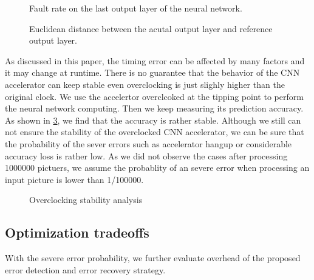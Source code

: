 \begin{figure}
    \caption{Fault rate on the last output layer of the neural network.}
\label{fig:cuowulv}
\vspace{-1em}
\end{figure}

\begin{figure}
    \caption{Euclidean distance between the acutal output layer and reference output layer.}
\label{fig:oushijuli}
\vspace{-1em}
\end{figure}

As discussed in this paper, the timing error can be affected by many factors and it may change 
at runtime. There is no guarantee that the behavior of the CNN accelerator can keep stable even 
overclocking is just slighly higher than the original clock. We use the accelertor overclcoked at the 
tipping point to perform the neural network computing. Then we keep measuring its 
prediction accuracy. As shown in \ref{fig:stability}, we find that the accuracy is rather stable.
Although we still can not ensure the stability of the overclocked CNN accelerator, we can 
be sure that the probability of the sever errors such as accelerator hangup or considerable 
accuracy loss is rather low. As we did not observe the cases after processing 1000000 pictuers, 
we assume the probablity of an severe error when processing an input picture is lower than 1/100000.
\begin{figure}
    \caption{Overclocking stability analysis}
\label{fig:stability}
\vspace{-1em}
\end{figure}


\subsection{Optimization tradeoffs}
With the severe error probability, we further evaluate overhead of 
the proposed error detection and error recovery strategy.

